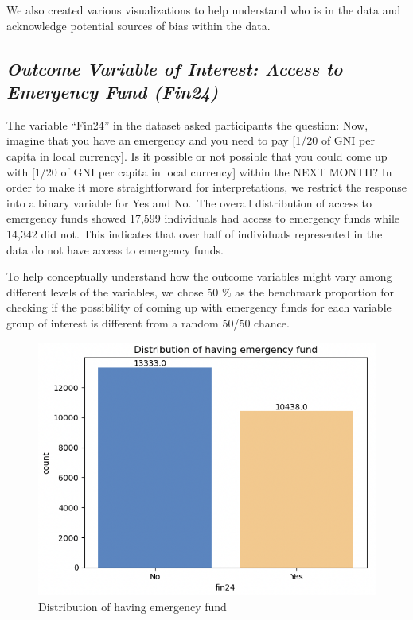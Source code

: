 \documentclass[12pt]{article}
\begin{document}
We also created various visualizations to help understand who is in the
data and acknowledge potential sources of bias within the data.

\hypertarget{outcome-variable-of-interest-access-to-emergency-fund-fin24}{%
\subsection{\texorpdfstring{\emph{Outcome Variable of Interest: Access
to Emergency Fund
(Fin24)}}{Outcome Variable of Interest: Access to Emergency Fund (Fin24)}}\label{outcome-variable-of-interest-access-to-emergency-fund-fin24}}

The variable ``Fin24'' in the dataset asked participants the question:
Now, imagine that you have an emergency and you need to pay {[}1/20 of
GNI per capita in local currency{]}. Is it possible or not possible that
you could come up with {[}1/20 of GNI per capita in local currency{]}
within the NEXT MONTH\citep{Demirguc-Kunt2022}? In order to make it more
straightforward for interpretations, we restrict the response into a
binary variable for Yes and No.~The overall distribution of access to
emergency funds showed 17,599 individuals had access to emergency funds
while 14,342 did not. This indicates that over half of individuals
represented in the data do not have access to emergency funds.

To help conceptually understand how the outcome variables might vary
among different levels of the variables, we chose 50 \% as the benchmark
proportion for checking if the possibility of coming up with emergency
funds for each variable group of interest is different from a random
50/50 chance.

\begin{figure}

{\centering \includegraphics[width=0.7\linewidth]{graphs/f24_graph1} 

}

\caption{Distribution of having emergency fund}\label{fig:unnamed-chunk-4}
\end{figure}
\end{document}
